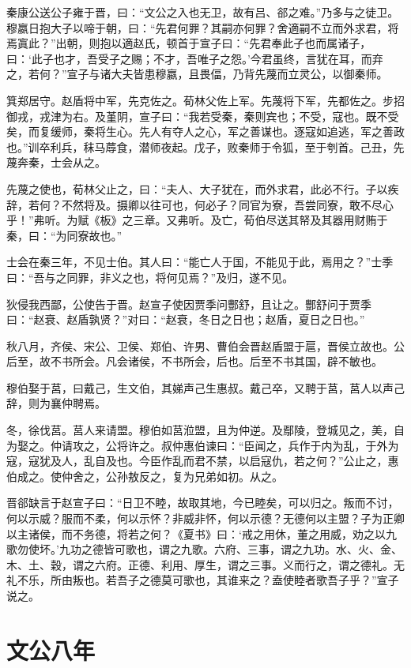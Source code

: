 \documentclass[a4paper,12pt,UTF8,twoside]{ctexbook}
\begin{document}
秦康公送公子雍于晋，曰：“文公之入也无卫，故有吕、郤之难。”乃多与之徒卫。穆嬴日抱大子以啼于朝，曰：“先君何罪？其嗣亦何罪？舍適嗣不立而外求君，将焉寘此？”出朝，则抱以適赵氏，顿首于宣子曰：“先君奉此子也而属诸子，曰：‘此子也才，吾受子之赐；不才，吾唯子之怨。’今君虽终，言犹在耳，而弃之，若何？”宣子与诸大夫皆患穆嬴，且畏偪，乃背先蔑而立灵公，以御秦师。

箕郑居守。赵盾将中军，先克佐之。荀林父佐上军。先蔑将下军，先都佐之。步招御戎，戎津为右。及堇阴，宣子曰：“我若受秦，秦则宾也；不受，寇也。既不受矣，而复缓师，秦将生心。先人有夺人之心，军之善谋也。逐寇如追逃，军之善政也。”训卒利兵，秣马蓐食，潜师夜起。戊子，败秦师于令狐，至于刳首。己丑，先蔑奔秦，士会从之。

先蔑之使也，荀林父止之，曰：“夫人、大子犹在，而外求君，此必不行。子以疾辞，若何？不然将及。摄卿以往可也，何必子？同官为寮，吾尝同寮，敢不尽心乎！”弗听。为赋《板》之三章。又弗听。及亡，荀伯尽送其帑及其器用财贿于秦，曰：“为同寮故也。”

士会在秦三年，不见士伯。其人曰：“能亡人于国，不能见于此，焉用之？”士季曰：“吾与之同罪，非义之也，将何见焉？”及归，遂不见。

狄侵我西鄙，公使告于晋。赵宣子使因贾季问酆舒，且让之。酆舒问于贾季曰：“赵衰、赵盾孰贤？”对曰：“赵衰，冬日之日也；赵盾，夏日之日也。”

秋八月，齐侯、宋公、卫侯、郑伯、许男、曹伯会晋赵盾盟于扈，晋侯立故也。公后至，故不书所会。凡会诸侯，不书所会，后也。后至不书其国，辟不敏也。

穆伯娶于莒，曰戴己，生文伯，其娣声己生惠叔。戴己卒，又聘于莒，莒人以声己辞，则为襄仲聘焉。

冬，徐伐莒。莒人来请盟。穆伯如莒涖盟，且为仲逆。及鄢陵，登城见之，美，自为娶之。仲请攻之，公将许之。叔仲惠伯谏曰：“臣闻之，兵作于内为乱，于外为寇，寇犹及人，乱自及也。今臣作乱而君不禁，以启寇仇，若之何？”公止之，惠伯成之。使仲舍之，公孙敖反之，复为兄弟如初。从之。

晋郤缺言于赵宣子曰：“日卫不睦，故取其地，今已睦矣，可以归之。叛而不讨，何以示威？服而不柔，何以示怀？非威非怀，何以示德？无德何以主盟？子为正卿以主诸侯，而不务德，将若之何？《夏书》曰：‘戒之用休，董之用威，劝之以九歌勿使坏。’九功之德皆可歌也，谓之九歌。六府、三事，谓之九功。水、火、金、木、土、穀，谓之六府。正德、利用、厚生，谓之三事。义而行之，谓之德礼。无礼不乐，所由叛也。若吾子之德莫可歌也，其谁来之？盍使睦者歌吾子乎？”宣子说之。

\chapter{文公八年}
\end{document}
